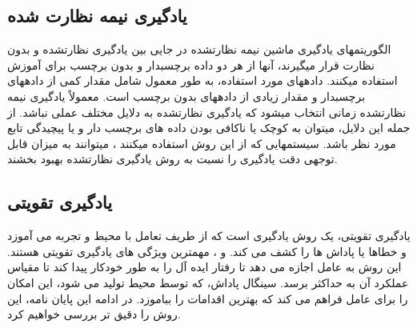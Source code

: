 
\subsection{یادگیری نیمه نظارت شده}

الگوریتم\nf های یادگیری ماشین نیمه نظارت\nf شده در جایی بین یادگیری نظارت\nf شده و بدون نظارت قرار می\nf گیرند، آن\nf ها از هر دو داده برچسب\nf دار و بدون برچسب برای آموزش استفاده می\nf کنند. داده\nf های مورد استفاده، به طور معمول شامل مقدار کمی از داده\nf های برچسب\nf دار و مقدار زیادی از داده\nf های بدون برچسب است. معمولاً یادگیری نیمه نظارت\nf شده زمانی انتخاب می\nf شود که یادگیری نظارت\nf شده به دلایل مختلف عملی نباشد. از جمله این دلایل، می\nf توان به کوچک یا ناکافی بودن داده های برچسب دار  و یا پیچیدگی تابع مورد نظر باشد. سیستم\nf هایی که از این روش استفاده می\nf کنند ، می\nf توانند به میزان قابل توجهی دقت یادگیری را نسبت به روش یادگیری نظارت\nf شده بهبود بخشند. 

\subsection{یادگیری تقویتی}
یادگیری تقویتی، یک روش یادگیری است که از طریف تعامل با محیط و تجربه می \nf آموزد و خطاها یا پاداش ها را کشف می کند.  و ، مهمترین ویژگی  های یادگیری تقویتی هستند. این روش به عامل اجازه می دهد تا رفتار ایده آل را به طور خودکار پیدا کند تا مقیاس عملکرد آن به حداکثر برسد. سینگال پاداش،  که توسط محیط تولید می شود، این امکان را برای عامل فراهم می \nf کند که بهترین اقدامات را بباموزد. در ادامه این پایان نامه، این روش را دقیق تر بررسی خواهیم کرد.


